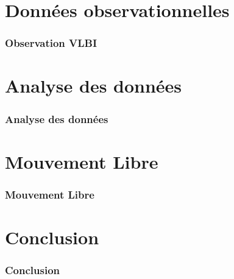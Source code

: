\documentclass[french]{beamer}
\newcommand{\frtt}[1]{\frametitle{#1}}
\begin{document}



\section{Données observationnelles}

\begin{frame}
  \frtt{Observation VLBI}
\end{frame}

\section{Analyse des données}

\begin{frame}
  \frtt{Analyse des données}
\end{frame}

\section{Mouvement Libre}
\begin{frame}
  \frtt{Mouvement Libre}
\end{frame}


\section{Conclusion}

\begin{frame}
  \frtt{Conclusion}
\end{frame}
\end{document}
